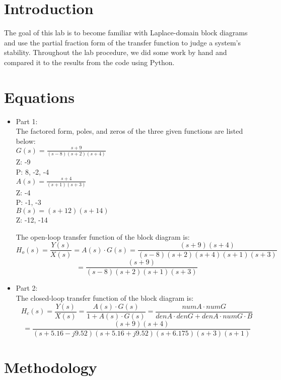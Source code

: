 \documentclass[12pt]{report}
\begin{document}
\section{Introduction}
The goal of this lab is to become familiar with Laplace-domain block diagrams and use the partial fraction form of the transfer function to judge a system's stability. Throughout the lab procedure, we did some work by hand and compared it to the results from the code using Python.


\section{Equations}

\begin{itemize}
    \item
    Part 1:\\
    The factored form, poles, and zeros of the three given functions are listed below:\\
    $G(s)=\frac{s+9}{(s-8)(s+2)(s+4)}$\\
    Z: -9\\
    P: 8, -2, -4\\
    
    $A(s)=\frac{s+4}{(s+1)(s+3)}$\\
    Z: -4\\
    P: -1, -3\\
    
    $B(s)=(s+12)(s+14)$\\
    Z: -12, -14
    
    The open-loop transfer function of the block diagram is:
    $$H_o(s)= \frac{Y(s)}{X(s)}=A(s)\cdot G(s)=\frac{(s+9)(s+4)}{(s-8)(s+2)(s+4)(s+1)(s+3)}$$$$=\frac{(s+9)}{(s-8)(s+2)(s+1)(s+3)}$$
    \item
    Part 2:\\
    The closed-loop transfer function of the block diagram is:
    $$H_c(s)= \frac{Y(s)}{X(s)}=\frac{A(s)\cdot G(s)}{1+A(s)\cdot G(s)}=\frac{numA\cdot numG}{denA\cdot denG+denA\cdot numG\cdot B}$$
    $$=\frac{(s+9)(s+4)}{(s+5.16-j9.52)(s+5.16+j9.52)(s+6.175)(s+3)(s+1)}$$

\end{itemize}

\section{Methodology}
\end{document}
